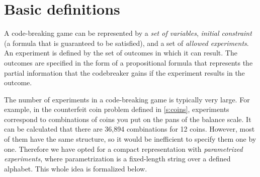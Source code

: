\section{Basic definitions}

A code-breaking game can be represented by a \emph{set of variables},
  \emph{initial constraint} (a formula that is guaranteed to be satisfied),
  and a set of \emph{allowed experiments}.
An experiment is defined by the set of outcomes in which it can result.
The outcomes are specified in the form of a propositional formula that
  represents the partial information
  that the codebreaker gains if the experiment results in the outcome.

The number of experiments in a code-breaking game is typically very large.
For example, in the counterfeit coin problem defined in \autoref{s:coins},
  experiments correspond to combinations of coins you put on the pans of the
  balance scale.
It can be calculated that there are 36,894 combinations for 12 coins.
However, most of them have the same structure,
  so it would be inefficient to specify them one by one.
Therefore we have opted for a compact representation with \emph{parametrized experiments},
  where parametrization is a fixed-length string over a defined alphabet.
This whole idea is formalized below.


